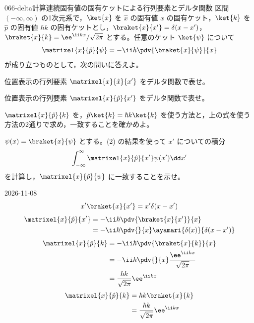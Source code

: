 \documentclass[uplatex,dvipdfmx,a4paper,11pt]{jsarticle}
\begin{document}
\begin{mondai}{066-delta}{計算}{連続固有値の固有ケットによる行列要素とデルタ関数}
区間 $(-\infty,\infty)$ の1次元系で，$\ket{x}$ を $\hat{x}$ の固有値 $x$ の固有ケット，$\ket{k}$ を $\hat{p}$ の固有値 $\hbar k$ の固有ケットとし，$\braket{x}{x'}=\delta(x-x')$，$\braket{x}{k}=\ee^{\ii kx}/\sqrt{2\pi}$ とする。任意のケット $\ket{\psi}$ について
  \[ \matrixel{x}{\hat{p}}{\psi}=-\ii\hbar\pdv{\braket{x}{\psi}}{x} \]
  が成り立つものとして，次の問いに答えよ。
  \begin{shoumon}
    \item 位置表示の行列要素 $\matrixel{x}{\hat{x}}{x'}$ をデルタ関数で表せ。
    \item 位置表示の行列要素 $\matrixel{x}{\hat{p}}{x'}$ をデルタ関数で表せ。
    \item $\matrixel{x}{\hat{p}}{k}$ を，$\hat{p}\ket{k}=\hbar k\ket{k}$ を使う方法と，上の式を使う方法の2通りで求め，一致することを確かめよ。
    \item $\psi(x)=\braket{x}{\psi}$ とする。(2) の結果を使って $x'$ についての積分
    \[ \int_{-\infty}^{\infty}\matrixel{x}{\hat{p}}{x'}\psi(x')\dd x' \]
    を計算し，$\matrixel{x}{\hat{p}}{\psi}$ に一致することを示せ。
  \end{shoumon}
\begin{kotaeutsushi}{2026-11-08}
\[ x'\braket{x}{x'}=x'\delta(x-x') \]
\begin{align*}
\matrixel{x}{\hat{p}}{x'}&=-\ii\hbar\pdv{\braket{x}{x'}}{x}\\
&=-\ii\hbar\pdv{}{x}\ayamari{\delta(x)}{\delta(x-x')}
\end{align*}
\begin{align*}
\matrixel{x}{\hat{p}}{k}&=-\ii\hbar\pdv{\braket{x}{k}}{x}\\
&=-\ii\hbar\pdv{}{x}\frac{\ee^{\ii kx}}{\sqrt{2\pi}}\\
&=\frac{\hbar k}{\sqrt{2\pi}}\ee^{\ii kx}
\end{align*}
\begin{align*}
\matrixel{x}{\hat{p}}{k}&=\hbar k\braket{x}{k}\\
&=\frac{\hbar k}{\sqrt{2\pi}}\ee^{\ii kx}
\end{align*}
\begin{align*}

\end{align*}
\end{kotaeutsushi}
\end{mondai}
\end{document}
